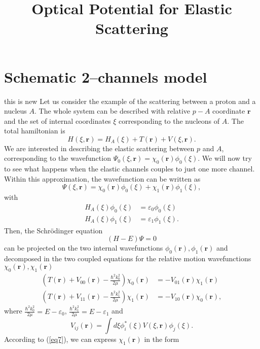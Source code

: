 \documentclass[a4paper,11pt]{article}
\title{Optical Potential for Elastic Scattering}
\begin{document}
\maketitle
\section{Schematic 2--channels model}
this is new
Let us  consider the example of the scattering between a proton and a nucleus $A$. The whole system can be described with relative $p-A$ coordinate $\mathbf{r}$ and the set of internal coordinates $\xi$ corresponding to the nucleons of $A$. The total hamiltonian is
\begin{equation}\label{eq1}
H(\xi,\mathbf{r})=H_{A}(\xi)+T(\mathbf{r})+V(\xi,\mathbf{r}).
\end{equation}
We are interested in describing  the elastic scattering between $p$ and $A$, corresponding to the wavefunction $\Psi_0(\xi,\mathbf{r})=\chi_0(\mathbf{r})\phi_0(\xi)$.
We will now try to see what happens when the elastic channels couples to just one more channel. Within this approximation, the wavefunction can be written as
\begin{equation}\label{eq2}
\Psi(\xi,\mathbf{r})=\chi_0(\mathbf{r})\phi_0(\xi)+\chi_1(\mathbf{r})\phi_1(\xi),
\end{equation}
with
\begin{eqnarray}\label{eq3}
\nonumber H_A(\xi)\phi_0(\xi)&=\varepsilon_0\phi_0(\xi)\\
H_A(\xi)\phi_1(\xi)&=\varepsilon_1\phi_1(\xi).
\end{eqnarray}
Then, the Schr\"{o}dinger equation
\begin{equation}\label{eq4}
(H-E)\Psi=0
\end{equation}
can be projected on the two internal wavefunctions $\phi_0(\mathbf{r}),\phi_1(\mathbf{r})$ and decomposed in the two coupled equations for the relative motion wavefunctions $\chi_0(\mathbf{r}),\chi_1(\mathbf{r})$
\begin{eqnarray}\label{eq5}
\nonumber \label{eq12}\left(T(\mathbf{r})+V_{00}(\mathbf{r})-\frac{\hbar^2k_0^2}{2 \mu}\right)\chi_0(\mathbf{r})&=-V_{01}(\mathbf{r})\chi_1(\mathbf{r})\\
\label{eq7} \left(T(\mathbf{r})+V_{11}(\mathbf{r})-\frac{\hbar^2k_1^2}{2 \mu}\right)\chi_1(\mathbf{r})&=-V_{10}(\mathbf{r})\chi_0(\mathbf{r}),
\end{eqnarray}
where $\tfrac{\hbar^2k_0^2}{2 \mu}=E-\varepsilon_0$, $\tfrac{\hbar^2k_1^2}{2 \mu}=E-\varepsilon_1$ and
\begin{equation}\label{eq6}
V_{ij}(\mathbf{r})=\int d\xi \phi^*_i(\xi)V(\xi,\mathbf{r})\phi_j(\xi).
\end{equation}
According to (\ref{eq7}), we can express $\chi_1(\mathbf{r})$ in the form
\end{document}
